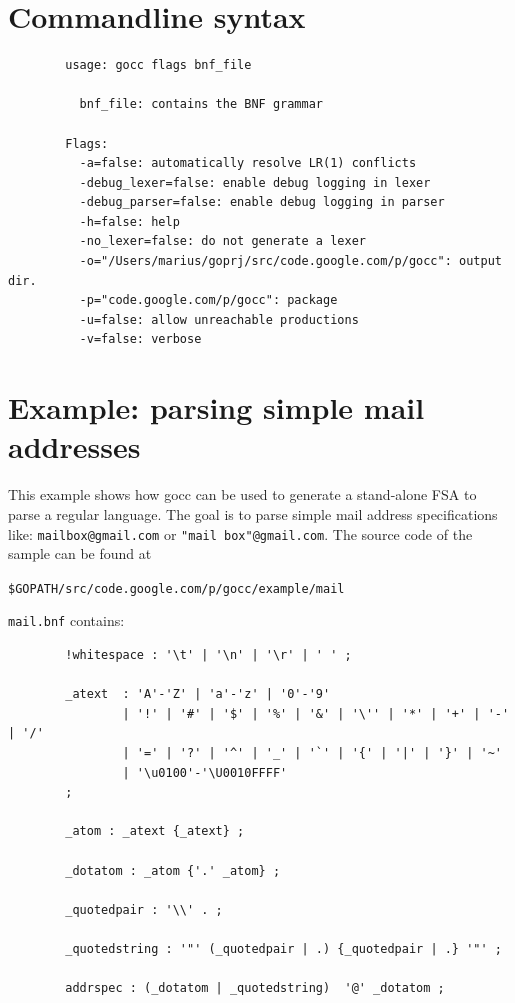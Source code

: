 \documentclass[12pt]{article}
\begin{document}
\section{Commandline syntax}\label{sec:commandline}
	\begin{verbatim}
        usage: gocc flags bnf_file
        
          bnf_file: contains the BNF grammar
        
        Flags:
          -a=false: automatically resolve LR(1) conflicts
          -debug_lexer=false: enable debug logging in lexer
          -debug_parser=false: enable debug logging in parser
          -h=false: help
          -no_lexer=false: do not generate a lexer
          -o="/Users/marius/goprj/src/code.google.com/p/gocc": output dir.
          -p="code.google.com/p/gocc": package
          -u=false: allow unreachable productions
          -v=false: verbose
	\end{verbatim}

\section{Example: parsing simple mail addresses} \label{sec:example mail}
	This example shows how gocc can be used to generate a stand-alone FSA to parse a regular language. The goal is to parse simple mail address specifications like: \verb|mailbox@gmail.com| or \verb|"mail box"@gmail.com|. The source code of the sample can be found at

	\verb|$GOPATH/src/code.google.com/p/gocc/example/mail|

	\verb|mail.bnf| contains:

	\begin{verbatim}
		!whitespace : '\t' | '\n' | '\r' | ' ' ;

		_atext  : 'A'-'Z' | 'a'-'z' | '0'-'9'	
		        | '!' | '#' | '$' | '%' | '&' | '\'' | '*' | '+' | '-' | '/' 
		        | '=' | '?' | '^' | '_' | '`' | '{' | '|' | '}' | '~'
		        | '\u0100'-'\U0010FFFF'
		;

		_atom : _atext {_atext} ;

		_dotatom : _atom {'.' _atom} ;

		_quotedpair : '\\' . ;

		_quotedstring : '"' (_quotedpair | .) {_quotedpair | .} '"' ;

		addrspec : (_dotatom | _quotedstring)  '@' _dotatom ;
	\end{verbatim}
\end{document}
